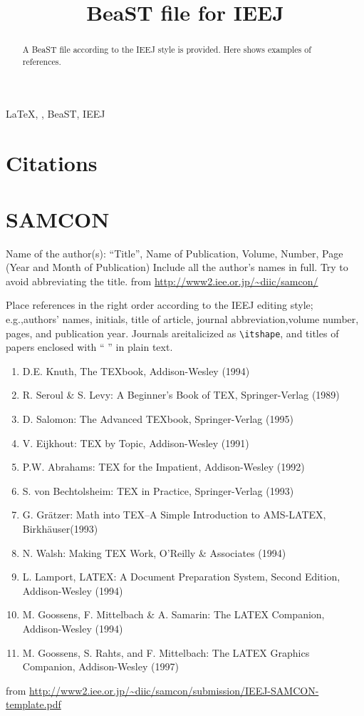 \documentclass[english]{ieej-e-samcon}
\title{BeaST file for IEEJ}
\begin{document}
\begin{abstract}
A BeaST file according to the IEEJ style is provided.
Here shows examples of references.
\end{abstract}
\begin{keyword}
  \LaTeX, , BeaST, IEEJ
\end{keyword}
\maketitle


\section*{Citations}
\Cite{Denki2001,Knuth1994,Yamada2001}


\section{SAMCON}
Name of the author(s): ``Title'', Name of Publication, Volume, Number, Page (Year and Month of Publication)
Include all the author's names in full.
Try to avoid abbreviating the title.
from \url{http://www2.iee.or.jp/~diic/samcon/}

Place references in the right order according to the IEEJ editing style; e.g.,authors' names, initials, title of article, journal abbreviation,volume number, pages, and publication year.
Journals areitalicized as \texttt{\textbackslash itshape}, and titles of papers enclosed with `` '' in plain text.
\footnotesize
\begin{enumerate}
  \item D.E. Knuth, The TEXbook, Addison-Wesley (1994)
  \item R. Seroul \& S. Levy: A Beginner's Book of TEX, Springer-Verlag (1989)
  \item D. Salomon: The Advanced TEXbook, Springer-Verlag (1995)
  \item V. Eijkhout: TEX by Topic, Addison-Wesley (1991)
  \item P.W. Abrahams: TEX for the Impatient, Addison-Wesley (1992)
  \item S. von Bechtolsheim: TEX in Practice, Springer-Verlag (1993)
  \item G. Gr\"atzer: Math into TEX–A Simple Introduction to AMS-LATEX, Birkh\"auser(1993)
  \item N. Walsh: Making TEX Work, O'Reilly \& Associates (1994)
  \item L. Lamport, LATEX:  A Document Preparation System, Second Edition, Addison-Wesley (1994)
  \item M. Goossens, F. Mittelbach \& A. Samarin: The LATEX Companion, Addison-Wesley (1994)
  \item M. Goossens, S. Rahts, and F. Mittelbach: The LATEX Graphics Companion, Addison-Wesley (1997)
\end{enumerate}
\normalsize
from \url{http://www2.iee.or.jp/~diic/samcon/submission/IEEJ-SAMCON-template.pdf}
\end{document}
